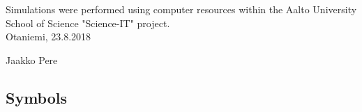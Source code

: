 \documentclass[english,12pt,a4paper,pdftex,sci,utf8]{aaltothesis} %
\date{23.8.2018}
\begin{document}
\makecoverpage

\makecopyrightpage


\begin{abstractpage}[english]
 \abstracttext{}
\end{abstractpage}






Simulations were performed using computer resources within the Aalto University School of Science "Science-IT" project.\\

\vspace{5cm}
Otaniemi, 23.8.2018

\vspace{5mm}
{\hfill Jaakko Pere \hspace{1cm}}

\newpage


\thesistableofcontents



\subsection*{Symbols}
\end{document}
